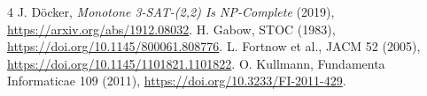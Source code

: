 \documentclass[10pt]{article}
\begin{document}
\begin{thebibliography}{4}
 J. D\"ocker, \emph{Monotone 3-SAT-(2,2) Is NP-Complete} (2019), \url{https://arxiv.org/abs/1912.08032}.
 H. Gabow, STOC (1983), \url{https://doi.org/10.1145/800061.808776}.
 L. Fortnow et al., JACM 52 (2005), \url{https://doi.org/10.1145/1101821.1101822}.
 O. Kullmann, Fundamenta Informaticae 109 (2011), \url{https://doi.org/10.3233/FI-2011-429}.
\end{thebibliography}
\end{document}
